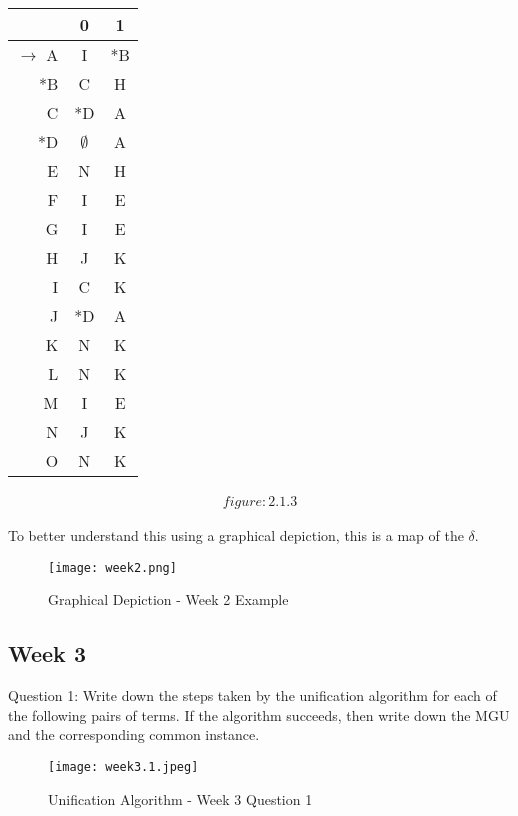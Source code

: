 \documentclass{article}
\theoremstyle{theorem}
\theoremstyle{definition}
\theoremstyle{remark}
\begin{document}
\begin{table}[h!] %
\centering
\begin{tabular}{r||c|c}
    & 0 & 1 \\
    \hline
    $\rightarrow$ A & I & *B \\
    *B & C & H \\
    C & *D & A \\
    *D & $\emptyset$ & A \\
    E & N & H \\
    F & I & E \\
    G & I & E \\
    H & J & K \\
    I & C & K \\
    J & *D & A \\
    K & N & K \\
    L & N & K \\
    M & I & E \\
    N & J & K \\
    O & N & K \\
\end{tabular}
\begin{align*}
figure:2.1.3
\end{align*}
\end{table}


\pagebreak
\medskip\noindent
To better understand this using a graphical depiction, this is a map of the $\delta$.

\begin{figure}[h!]
    \centering
    \texttt{[image: week2.png]}
    \caption{Graphical Depiction - Week 2 Example}
    \label{fig:Graphical Depiction - Week 2 Example}
\end{figure}

\subsection{Week 3}
Question 1: Write down the steps taken by the unification algorithm for each
of the following pairs of terms. If the algorithm succeeds, then write down the
MGU and the corresponding common instance.
\begin{figure}[h!]
    \centering
    \texttt{[image: week3.1.jpeg]}
    \caption{Unification Algorithm - Week 3 Question 1}
    \label{fig:Unification Algorithm - Week 3 Question 1}
\end{figure}
\pagebreak
\end{document}
